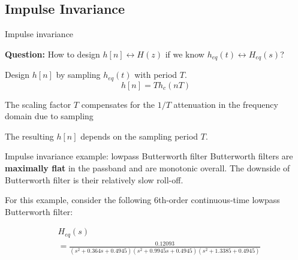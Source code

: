 \documentclass[10pt, handout]{beamer}
\begin{document}
\subsection{Impulse Invariance}
\begin{frame}{Impulse invariance}

\textbf{Question:} How to design $h[n] \longleftrightarrow H(z)$ if we know $h_{eq}(t) \longleftrightarrow H_{eq}(s)$?

\begin{center}
	\def\Heff{1}
	\resizebox{\linewidth}{!}{}
\end{center}

Design $h[n]$ by sampling $h_{eq}(t)$ with period $T$.
\begin{equation}
	h[n] = Th_c(nT) \tag{impulse invariance}
\end{equation}

The scaling factor $T$ compensates for the $1/T$ attenuation in the frequency domain due to sampling

The resulting $h[n]$ depends on the sampling period $T$.

\end{frame}

\begin{frame}{Impulse invariance example: lowpass Butterworth filter}
Butterworth filters are \textbf{maximally flat} in the passband and are monotonic overall. The downside of Butterworth filter is their relatively slow roll-off.
\vspace{0.25cm}

For this example, consider the following 6th-order continuous-time lowpass Butterworth filter:

\begin{align*}
&H_{eq}(s)  \\
&= \frac{0.12093}{(s^2 + 0.364s + 0.4945)(s^2 + 0.9945s + 0.4945)(s^2 + 1.3385 + 0.4945)}
\end{align*}

\end{frame}
\end{document}
